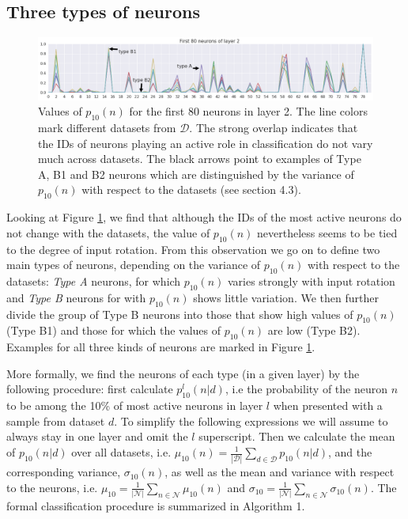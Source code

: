 \documentclass[10pt,a4paper]{article}
\begin{document}
\subsection{Three types of neurons}

\begin{figure}[t!]
\includegraphics[width=1\textwidth]{MostActive_Layer2_cut.png}
\caption{\footnotesize{Values of $p_{10}(n)$ for the first 80 neurons in layer 2. The line colors mark different datasets from $\mathcal{D}$. The strong overlap indicates that the IDs of neurons playing an active role in classification do not vary much across datasets. The black arrows point to examples of Type A, B1 and B2 neurons which are distinguished by the variance of $p_{10}(n)$ with respect to the datasets (see section 4.3).}}
\label{fig:MostActive_2}
\end{figure}

\noindent Looking at Figure \ref{fig:MostActive_2}, we find that although the IDs of the most active neurons do not change with the datasets, the value of $p_{10}(n)$ nevertheless seems to be tied to the degree of input rotation. From this observation we go on to define two main types of neurons, depending on the variance of $p_{10}(n)$ with respect to the datasets: \textit{Type A} neurons, for which $p_{10}(n)$ varies strongly with input rotation and \textit{Type B} neurons for with  $p_{10}(n)$ shows little variation. We then further divide the group of Type B neurons into those that show high values of $p_{10}(n) $ (Type B1) and those for which the values of $p_{10}(n)$ are low (Type B2). Examples for all three kinds of neurons are marked in Figure \ref{fig:MostActive_2}.\newline

\noindent  More formally, we find the neurons of each type (in a given layer) by the following procedure: first calculate $p_{10}^{l}(n | d)$, i.e the probability of the neuron $n$ to be among the 10\% of most active neurons in layer $l$ when presented with a sample from dataset $d$. To simplify the following expressions we will assume to always stay in one layer and omit the $l$ superscript. Then we calculate the mean of $p_{10}(n | d)$ over all datasets, i.e. $\mu_{10}(n) = \frac{1}{|\mathcal{D}|} \sum_{d \in \mathcal{D}} p_{10}(n|d)$, and the corresponding variance, $\sigma_{10}(n)$, as well as the mean and variance with respect to the neurons, i.e. $\mu_{10} = \frac{1}{|\mathcal{N}|} \sum_{n \in \mathcal{N}} \mu_{10}(n)$ and $\sigma_{10} = \frac{1}{|\mathcal{N}|} \sum_{n \in \mathcal{N}} \sigma_{10}(n)$. The formal classification procedure is summarized in Algorithm 1.
\end{document}
